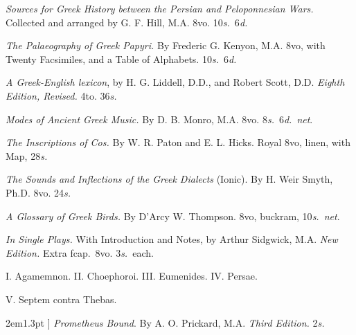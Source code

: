\documentclass[12pt,oneside]{book}[2021/10/04]
\newcommand{\singleline}{
  \hspace*{0.33\textwidth}{\rule{0.33\textwidth}{0.4pt}}
}
\newcommand{\longdash}{\rule[.5ex]{2em}{1.3pt}
}
\newenvironment{advlist}{
  \begin{description}[leftmargin=1em, parsep=0.2ex, listparindent=1em,]
}{\end{description}}
\newenvironment{vollist}{
\begin{description}[nosep, topsep=-1ex, itemindent=-1em, leftmargin=2em]
}{\end{description}}
\newcommand{\¬}{\hphantom{0}}
\begin{document}
\begin{advlist}
\item[Hill.] \textit{Sources for Greek History
between the Persian and Peloponnesian
Wars.} Collected and arranged
by G. F. Hill, M.A. 8vo. 10\textit{s.}\ 6\textit{d.}

\item[Kenyon.] \textit{The Palaeography
of Greek Papyri.} By Frederic G.
Kenyon, M.A. 8vo, with Twenty
Facsimiles, and a Table of Alphabets.
10\textit{s.}\ 6\textit{d.}

\item[Liddell and Scott.] \textit{A Greek-English
lexicon}, by H. G. Liddell,
D.D., and Robert Scott, D.D. \textit{Eighth
Edition, Revised.} 4to. 36\textit{s.}

\item[Monro.] \textit{Modes of Ancient
Greek Music.} By D. B. Monro, M.A.
8vo. 8\textit{s.}\ 6\textit{d.}\ \textit{net}.

\item[Paton and Hicks.] \textit{The Inscriptions
of Cos.} By W. R. Paton
and E. L. Hicks. Royal 8vo, linen,
with Map, 28\textit{s.}

\item[Smyth.] \textit{The Sounds and
Inflections of the Greek Dialects} (Ionic).
By H. Weir Smyth, Ph.D. 8vo. 24\textit{s.}

\item[Thompson.] \textit{A Glossary of
Greek Birds.} By D'Arcy W. Thompson.
8vo, buckram, 10\textit{s.}\ \textit{net}.

\item \singleline

\item[Aeschylus.] \textit{In Single Plays.}
With Introduction and Notes, by
Arthur Sidgwick, M.A. \textit{New
Edition.} Extra fcap.\ 8vo. 3\textit{s.}\ each.
\begin{vollist}
\item I. Agamemnon. II. Choephoroi.
III. Eumenides. IV. Persae.
\item V. Septem contra Thebas.
\end{vollist}

\item[\longdash] \textit{Prometheus Bound}. By
A. O. Prickard, M.A. \textit{Third Edition.} 2\textit{s.}


\end{advlist}
\end{document}
